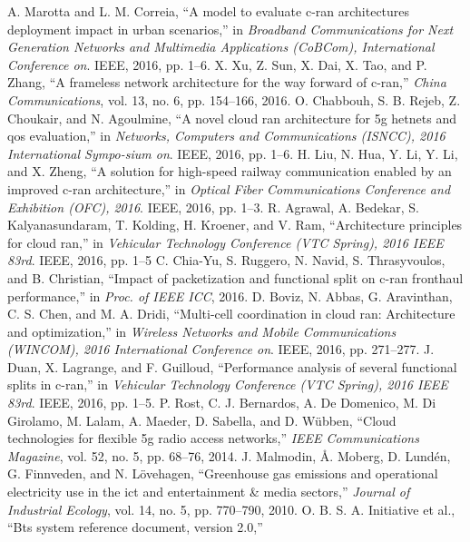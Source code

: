 \begin{multicols}{2}
\begin{thebibliography}{99}
 A. Marotta and L. M. Correia, “A model to evaluate c-ran architectures deployment impact in urban scenarios,” in \textit{Broadband Communications for Next Generation Networks and Multimedia Applications (CoBCom), International Conference on}. IEEE, 2016, pp. 1–6.
 X. Xu, Z. Sun, X. Dai, X. Tao, and P. Zhang, “A frameless network architecture for the way forward of c-ran,” \textit{China Communications}, vol. 13, no. 6, pp. 154–166, 2016.
 O. Chabbouh, S. B. Rejeb, Z. Choukair, and N. Agoulmine, “A novel cloud ran architecture for 5g hetnets and qos evaluation,” in \textit{Networks, Computers and Communications (ISNCC), 2016 International Sympo-sium on}. IEEE, 2016, pp. 1–6.
 H. Liu, N. Hua, Y. Li, Y. Li, and X. Zheng, “A solution for high-speed railway communication enabled by an improved c-ran architecture,” in \textit{Optical Fiber Communications Conference and Exhibition (OFC), 2016}. IEEE, 2016, pp. 1–3.
 R. Agrawal, A. Bedekar, S. Kalyanasundaram, T. Kolding, H. Kroener, and V. Ram, “Architecture principles for cloud ran,” in \textit{Vehicular Technology Conference (VTC Spring), 2016 IEEE 83rd}. IEEE, 2016, pp. 1–5
 C. Chia-Yu, S. Ruggero, N. Navid, S. Thrasyvoulos, and B. Christian, “Impact of packetization and functional split on c-ran fronthaul performance,” in \textit{Proc. of IEEE ICC}, 2016.
 D. Boviz, N. Abbas, G. Aravinthan, C. S. Chen, and M. A. Dridi, “Multi-cell coordination in cloud ran: Architecture and optimization,” in \textit{Wireless Networks and Mobile Communications (WINCOM), 2016 International Conference on}. IEEE, 2016, pp. 271–277.
 J. Duan, X. Lagrange, and F. Guilloud, “Performance analysis of several functional splits in c-ran,” in \textit{Vehicular Technology Conference (VTC Spring), 2016 IEEE 83rd}. IEEE, 2016, pp. 1–5.
 P. Rost, C. J. Bernardos, A. De Domenico, M. Di Girolamo, M. Lalam, A. Maeder, D. Sabella, and D. Wübben, “Cloud technologies for flexible 5g radio access networks,” \textit{IEEE Communications Magazine}, vol. 52, no. 5, pp. 68–76, 2014.
 J. Malmodin, Å. Moberg, D. Lundén, G. Finnveden, and N. Lövehagen, “Greenhouse gas emissions and operational electricity use in the ict and entertainment \& media sectors,” \textit{Journal of Industrial Ecology}, vol. 14, no. 5, pp. 770–790, 2010.
 O. B. S. A. Initiative et al., “Bts system reference document, version 2.0,” 


\end{thebibliography}
\end{multicols}
